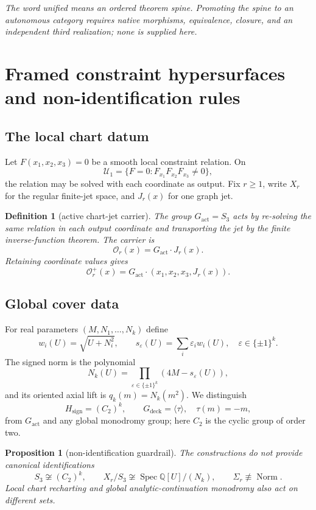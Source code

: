 \documentclass[11pt]{article}
\newtheorem{proposition}[theorem]{Proposition}
\newtheorem{definition}[theorem]{Definition}
\theoremstyle{remark}
\newcommand{\Q}{\mathbb Q}
\newcommand{\proofstop}[1]{\par\medskip\noindent{\color{red!75!black}\textbf{STOP--PROOF.}} \textit{#1}\par\medskip}
\begin{document}
\proofstop{The word unified means an ordered theorem spine. Promoting
the spine to an autonomous category requires native morphisms, equivalence,
closure, and an independent third realization; none is supplied here.}

\section{Framed constraint hypersurfaces and non-identification rules}

\subsection{The local chart datum}

Let $F(x_1,x_2,x_3)=0$ be a smooth local constraint relation. On
\[
\mathcal U_1=\{F=0:F_{x_1}F_{x_2}F_{x_3}\neq0\},
\]
the relation may be solved with each coordinate as output. Fix $r\geq1$,
write $X_r$ for the regular finite-jet space, and $J_r(x)$ for one graph jet.

\begin{definition}[active chart-jet carrier]
The group $G_{\mathrm{act}}=S_3$ acts by re-solving the same relation in
each output coordinate and transporting the jet by the finite inverse-function
theorem. The carrier is
\[
\mathcal O_r(x)=G_{\mathrm{act}}\cdot J_r(x).
\]
Retaining coordinate values gives
\[
\mathcal O_r^+(x)
=G_{\mathrm{act}}\cdot(x_1,x_2,x_3,J_r(x)).
\]
\end{definition}

\subsection{Global cover data}

For real parameters $(M,N_1,\ldots,N_k)$ define
\[
w_i(U)=\sqrt{U+N_i^2},\qquad
s_\varepsilon(U)=\sum_i\varepsilon_iw_i(U),
\quad\varepsilon\in\{\pm1\}^k.
\]
The signed norm is the polynomial
\[
N_k(U)=\prod_{\varepsilon\in\{\pm1\}^k}
\left(4M-s_\varepsilon(U)\right),
\]
and its oriented axial lift is $q_k(m)=N_k(m^2)$. We distinguish
\[
H_{\mathrm{sign}}=(C_2)^k,\qquad
G_{\mathrm{deck}}=\langle\tau\rangle,\quad\tau(m)=-m,
\]
from $G_{\mathrm{act}}$ and any global monodromy group; here $C_2$ is the
cyclic group of order two.

\begin{proposition}[non-identification guardrail]
The constructions do not provide canonical identifications
\[
S_3\not\cong(C_2)^k,\qquad
X_r/S_3\not\cong\operatorname{Spec}\Q[U]/(N_k),\qquad
\Sigma_r\not\equiv\operatorname{Norm}.
\]
Local chart recharting and global analytic-continuation monodromy also act on
different sets.
\end{proposition}
\end{document}
